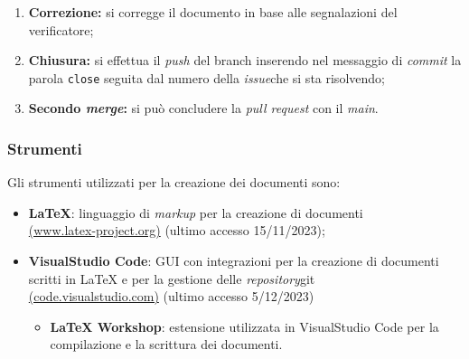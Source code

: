 \begin{itemize}
\begin{enumerate}
		      \item \textbf{Correzione:} si corregge il documento
		            in base alle segnalazioni del verificatore;

		      \item \textbf{Chiusura:} si effettua il \textit{push} del
		            branch inserendo nel messaggio di \textit{commit} la parola
		            \texttt{close} seguita dal numero della \textit{issue}\g che si sta
		            risolvendo;

		      \item \textbf{Secondo \textit{merge}:} si può concludere la
		            \textit{pull request} con il \textit{main}.
	      \end{enumerate}
\end{itemize}

\subsubsection{Strumenti}
Gli strumenti utilizzati per la creazione dei documenti sono:
\begin{itemize}
	\item \textbf{LaTeX}: linguaggio di \textit{markup} per la creazione di documenti \\
	      \href{https://www.latex-project.org/}{(www.latex-project.org)} (ultimo accesso 15/11/2023);
	\item \textbf{VisualStudio Code}: GUI con integrazioni per la creazione di documenti scritti in LaTeX e per la gestione delle \textit{repository}\g git\g \\
	      \href{https://code.visualstudio.com/}{(code.visualstudio.com)} (ultimo accesso 5/12/2023)
	      \begin{itemize}
		      \item \textbf{LaTeX Workshop}: estensione utilizzata in VisualStudio Code per la compilazione e la scrittura dei documenti.
	      \end{itemize}
\end{itemize}
